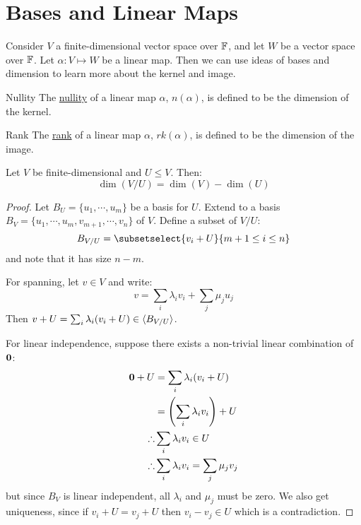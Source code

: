 \documentclass[../Main.tex]{subfiles}
\begin{document}
\section{Bases and Linear Maps}
Consider $V$ a finite-dimensional vector space over $\mathbb{F}$, and let $W$ be a vector space over $\mathbb{F}$. Let $\alpha : V \mapsto W$ be a linear map. Then we can use ideas of bases and dimension to learn more about the kernel and image.
\begin{definition}{Nullity}
    The \underline{nullity} of a linear map $\alpha$, $n(\alpha)$, is defined to be the dimension of the kernel. 
\end{definition}
\begin{definition}{Rank}
    The \underline{rank} of a linear map $\alpha$, $rk(\alpha)$, is defined to be the dimension of the image.
\end{definition}
\begin{lemma}
    Let $V$ be finite-dimensional and $U \leq V$. Then:
    \begin{equation}
        \dim(V / U) = \dim(V) - \dim(U)
        \label{eqnQuotientSizes}
    \end{equation}
    \label{lemQuotientSizes}
\end{lemma}
\begin{proof}
    Let $B_U = \{u_1, \cdots, u_m\}$ be a basis for $U$. Extend to a basis $B_V = \{u_1, \cdots, u_m, v_{m+1}, \cdots, v_n\}$ of $V$. Define a subset of $V / U$:
    \begin{equation*}
        B_{V / U} = \subsetselect{v_i + U}{m+1 \leq i \leq n}
    \end{equation*}
    and note that it has size $n - m$.

    For spanning, let $v \in V$ and write:
    \begin{equation*}
        v = \sum_{i} \lambda_i v_i + \sum_{j} \mu_j u_j
    \end{equation*}
    Then $v + U = \sum_i \lambda_i(v_i + U) \in \langle B_{V / U} \rangle$.

    For linear independence, suppose there exists a non-trivial linear combination of $\boldsymbol{0}$:
    \begin{align*}
        \boldsymbol{0} + U &= \sum_i \lambda_i(v_i + U) \\
        &= \left(\sum_i \lambda_i v_i\right) + U \\
        \therefore &\sum_i \lambda_i v_i \in U \\
        \therefore &\sum_i \lambda_i v_i = \sum_j \mu_j v_j
    \end{align*}
    but since $B_V$ is linear independent, all $\lambda_i$ and $\mu_j$ must be zero. We also get uniqueness, since if $v_i + U = v_j + U$ then $v_i - v_j \in U$ which is a contradiction.
\end{proof}
\end{document}
